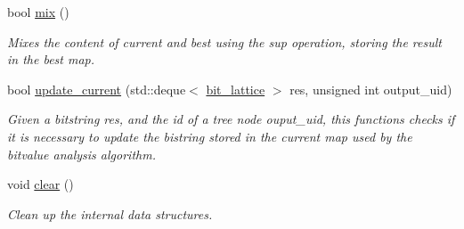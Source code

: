 \begin{DoxyCompactItemize}
bool \hyperlink{classBitLatticeManipulator_a0834f7ec7dd8449fae5bdb6c60619956}{mix} ()
\begin{DoxyCompactList}\small\item\em Mixes the content of current and best using the sup operation, storing the result in the best map. \end{DoxyCompactList}\item 
bool \hyperlink{classBitLatticeManipulator_a6bda5aa5bd5ef58340ad9b6db93643fa}{update\+\_\+current} (std\+::deque$<$ \hyperlink{bit__lattice_8hpp_ab732360111c810c4eaeb4c8b81d160d6}{bit\+\_\+lattice} $>$ res, unsigned int output\+\_\+uid)
\begin{DoxyCompactList}\small\item\em Given a bitstring res, and the id of a tree node ouput\+\_\+uid, this functions checks if it is necessary to update the bistring stored in the current map used by the bitvalue analysis algorithm. \end{DoxyCompactList}\item 
void \hyperlink{classBitLatticeManipulator_a42eb6c4e6540a538398764f35761dbe3}{clear} ()
\begin{DoxyCompactList}\small\item\em Clean up the internal data structures. \end{DoxyCompactList}\end{DoxyCompactItemize}
